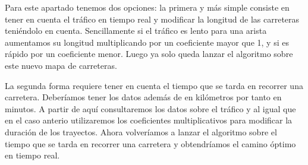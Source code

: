 \documentclass[11pt, a4paper, spanish, openright, twoside]{book}
\begin{document}
	\begin{section}
		Para este apartado tenemos dos opciones: la primera y más simple consiste en tener en cuenta el tráfico en tiempo real y modificar la longitud de las carreteras teniéndolo en cuenta. Sencillamente 
		si el tráfico es lento para una arista aumentamos su longitud multiplicando por un coeficiente mayor que 1, y si es rápido por un coeficiente menor. Luego ya solo queda lanzar el algoritmo sobre este 
		nuevo mapa de carreteras.

		La segunda forma requiere tener en cuenta el tiempo que se tarda en recorrer una carretera. Deberíamos tener los datos además de en kilómetros por tanto en minutos. A partir de aquí consultaremos los datos sobre el tráfico 
		y al igual que en el caso anterio utilizaremos los coeficientes multiplicativos para modificar la duración de los trayectos. Ahora volveríamos a lanzar el algoritmo sobre el tiempo que se tarda en recorrer una carretera y obtendríamos 
		el camino óptimo en tiempo real.


	\end{section}
\end{document}
